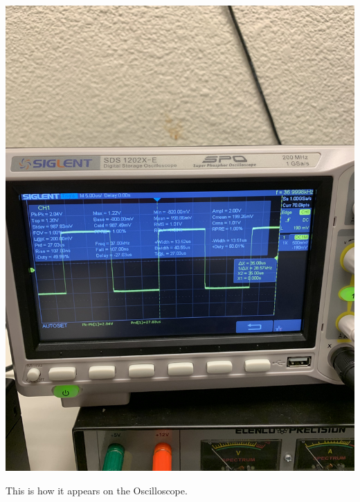\documentclass[]{article}
\begin{document}
	\begin{center}
		\includegraphics[scale=.05]{pulse_osci.jpg}\\
	\end{center}
	This is how it appears on the Oscilloscope.
\end{document}
